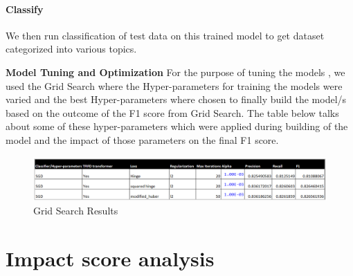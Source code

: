 \documentclass[paper=a4, fontsize=11pt]{scrartcl}
\numberwithin{equation}{section}		%
\numberwithin{figure}{section}			%
\numberwithin{table}{section}				%
\begin{document}
\paragraph{Classify} We then run classification of test data on this trained model to get dataset categorized into various topics.

\textbf{Model Tuning and Optimization}
For the purpose of tuning the models , we used the Grid Search where the Hyper-parameters for training the models were varied and the best Hyper-parameters where chosen to finally build the model/s based on the outcome of the F1 score from Grid Search.  The table below talks about some of these hyper-parameters which were applied during building of the model and the impact of those parameters on the final F1 score.
\begin{figure}
	\centering
 	 \includegraphics[width=0.9\linewidth]{Grid-Search.png}
	  \caption{Grid Search Results}
 	 \label{fig:Grid Search.png}
\end{figure}


\section{Impact score analysis}
\end{document}
